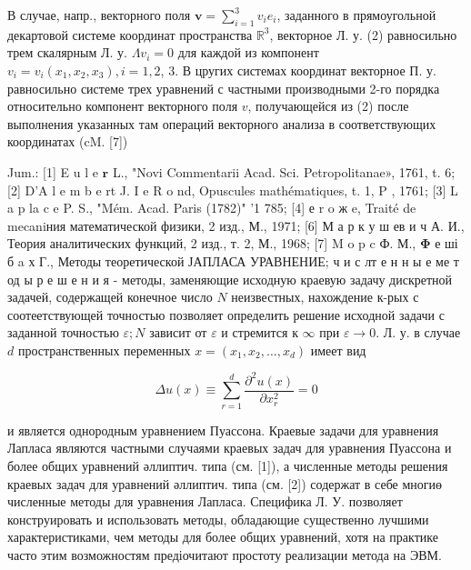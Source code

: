 \documentclass[10pt]{article}
\begin{document}
В случае, напр., векторного поля $\boldsymbol{v}=\sum_{i=1}^{3} v_{i} e_{i}$, заданного в прямоугольной декартовой системе координат пространства $\mathbb{R}^{3}$, векторное Л. у. (2) равносильно трем скалярным Л. у. $\Lambda v_{i}=0$ для каждой из компонент $v_{i}=v_{i}\left(x_{1}, x_{2}, x_{3}\right), i=1,2$, 3. В цругих системах координат векторное П. у. равносильно системе трех уравнений с частными производными 2-го порядка относительно компонент векторного поля $v$, получающейся из (2) после выполнения указанных там операций векторного анализа в соответствующих координатах (cM. [7])



Jum.: [1] E u l e $\mathbf{r}$ L., "Novi Commentarii Acad. Sci. Petropolitanae», 1761, t. 6; [2] D'A l e m b e rt J. I e R o nd, Opuscules mathématiques, t. 1, P , 1761; [3] L a p la c e P. S., "Mém. Acad. Paris (1782)" '1 785; [4] е r o ж e, Traité de mecaniния математической физики, 2 изд., М., 1971; [6] М а р к у ш ев и ч А. И., Теория аналитических функций, 2 изд., т. 2, М., 1968; [7] M o p c Ф. М., $\boldsymbol{\Phi}$ е ші б a х Г., Методы теоретической ЈАПЛАСА УРАВНЕНИЕ; ч и с лт е н н ы е ме т од ы р е ш е н и я - методы, заменяющие исходную краевую задачу дискретной задачей, содержащей конечное число $N$ неизвестных, нахождение к-рых с соотеетствующей точностью позволяет определить решение исходной задачи с заданной точностью $\varepsilon ; N$ зависит от $\varepsilon$ и стремится к $\infty$ при $\varepsilon \rightarrow 0$. Л. у. в случае $d$ пространственных переменных $x=\left(x_{1}, x_{2}, \ldots, x_{d}\right)$ имеет вид



\[

\Delta u(x) \equiv \sum_{r=1}^{d} \frac{\partial^{2} u(x)}{\partial x_{r}^{2}}=0

\]



и является однородным уравнением Пуассона. Краевые задачи для уравнения Лапласа являются частными случаями краевых задач для уравнения Пуассона и более общих уравнений әллиптич. типа (см. [1]), а численные методы решения краевых задач для уравнений әллиптич. типа (см. [2]) содержат в себе многиө численные методы для уравнения Лапласа. Специфика Л. У. позволяет конструировать и использовать методы, обладающие существенно лучшими характеристиками, чем методы для более общих уравнений, хотя на практике часто этим возможностям предіочитают простоту реализации метода на ЭВМ.
\end{document}
